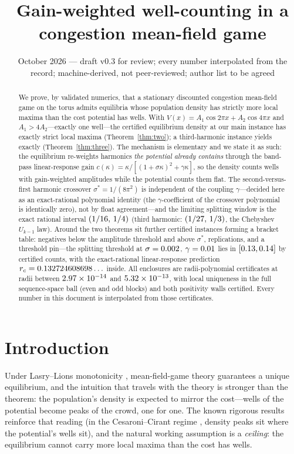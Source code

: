 \documentclass[11pt]{article}
\title{Gain-weighted well-counting in a congestion mean-field game}
\author{\cmauthor}
\date{October 2026 --- draft v0.3 for review; every number interpolated from the record; machine-derived, not peer-reviewed; author list to be agreed}
\begin{document}
\maketitle

\begin{abstract}
We prove, by validated numerics, that a stationary discounted congestion
mean-field game on the torus admits equilibria whose population density has
strictly more local maxima than the cost potential has wells. With
$V(x)=A_1\cos 2\pi x+A_2\cos 4\pi x$ and $A_1>4A_2$---exactly one well---the
certified equilibrium density at our main instance has exactly \TOnePeaks{}
strict local maxima (Theorem~\ref{thm:two}); a third-harmonic instance yields
exactly \TSixPeaks{} (Theorem~\ref{thm:three}). The mechanism is elementary and
we state it as such: the equilibrium re-weights harmonics \emph{the potential
already contains} through the band-pass linear-response gain
$c(\kappa)=\kappa/[(1+\sigma\kappa)^2+\gamma\kappa]$, so the density counts
wells with gain-weighted amplitudes while the potential counts them flat. The
second-versus-first harmonic crossover $\sigma^*=1/(8\pi^2)$ is independent of
the coupling $\gamma$---decided here as an exact-rational polynomial identity
(the $\gamma$-coefficient of the crossover polynomial is identically zero), not
by float agreement---and the limiting splitting window is the exact rational
interval $(1/16,\,1/4)$ (third harmonic:
$(1/27,\,1/3)$, the Chebyshev $U_{k-1}$ law). Around the
two theorems sit \NumBracketRowsWord{} further certified instances forming a
bracket table: negatives below the amplitude threshold and above $\sigma^*$,
replications, and a threshold pin---the splitting threshold at
$\sigma=0.002$, $\gamma=0.01$ lies in $[0.13,0.14]$ by certified
counts, with the exact-rational linear-response prediction
$r_c=0.132724608698\ldots$ inside. All enclosures are radii-polynomial certificates
at radii between $2.97\times10^{-14}$ and $5.32\times10^{-13}$, with local uniqueness in the
full sequence-space ball (even and odd blocks) and both positivity walls
certified. Every number in this document is interpolated from those
certificates.
\end{abstract}

\section{Introduction}

Under Lasry--Lions monotonicity \cite{LasryLions}, mean-field-game theory
guarantees a unique equilibrium, and the intuition that travels with the theory
is stronger than the theorem: the population's density is expected to mirror
the cost---wells of the potential become peaks of the crowd, one for one. The
known rigorous results reinforce that reading (in the Cesaroni--Cirant regime
\cite{CesaroniCirant}, density peaks sit where the potential's wells sit), and
the natural working assumption is a \emph{ceiling}: the equilibrium cannot
carry more local maxima than the cost has wells.
\end{document}
